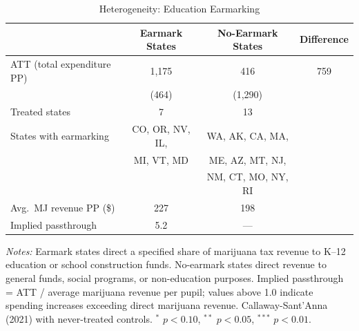 
\begin{table}[htbp]
\centering
\caption{Heterogeneity: Education Earmarking}
\label{tab:earmark}
\small
\begin{tabular}{lccc}
\hline\hline
 & Earmark States & No-Earmark States & Difference \\
\hline
ATT (total expenditure PP) & 1,175 & 416 & 759 \\
 & (464) & (1,290) & \\[6pt]
Treated states & 7 & 13 & \\
States with earmarking & CO, OR, NV, IL, & WA, AK, CA, MA, & \\
 & MI, VT, MD & ME, AZ, MT, NJ, & \\
 & & NM, CT, MO, NY, RI & \\[6pt]
Avg.~MJ revenue PP (\$) & 227 & 198 & \\
Implied passthrough & 5.2 & --- & \\
\hline\hline
\end{tabular}
\begin{tablenotes}
\small
\item \textit{Notes:} Earmark states direct a specified share of marijuana tax revenue to K--12 education or school construction funds. No-earmark states direct revenue to general funds, social programs, or non-education purposes. Implied passthrough = ATT / average marijuana revenue per pupil; values above 1.0 indicate spending increases exceeding direct marijuana revenue. Callaway-Sant'Anna (2021) with never-treated controls. $^{*}$ $p<0.10$, $^{**}$ $p<0.05$, $^{***}$ $p<0.01$.
\end{tablenotes}
\end{table}

